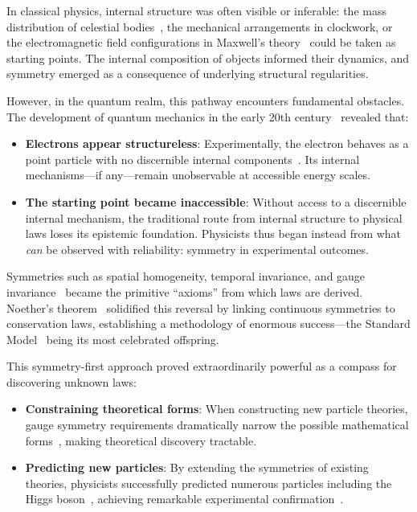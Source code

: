 \documentclass[%
 reprint,
 amsmath,amssymb,
 aps,
]{revtex4-1}
\numberwithin{equation}{section}%
\begin{document}
In classical physics, internal structure was often visible or inferable: the mass distribution of celestial bodies~\cite{newton1687}, the mechanical arrangements in clockwork, or the electromagnetic field configurations in Maxwell's theory~\cite{maxwell1873} could be taken as starting points. The internal composition of objects informed their dynamics, and symmetry emerged as a consequence of underlying structural regularities.

However, in the quantum realm, this pathway encounters fundamental obstacles. The development of quantum mechanics in the early 20th century~\cite{heisenberg1925,schrodinger1926} revealed that:

\begin{itemize}
  \item \textbf{Electrons appear structureless}: Experimentally, the electron behaves as a point particle with no discernible internal components~\cite{dehmelt1988}. Its internal mechanisms---if any---remain unobservable at accessible energy scales.
  \item \textbf{The starting point became inaccessible}: Without access to a discernible internal mechanism, the traditional route from internal structure to physical laws loses its epistemic foundation. Physicists thus began instead from what \emph{can} be observed with reliability: symmetry in experimental outcomes.
\end{itemize}

Symmetries such as spatial homogeneity, temporal invariance, and gauge invariance~\cite{yang1954} became the primitive ``axioms'' from which laws are derived. Noether's theorem~\cite{noether1918} solidified this reversal by linking continuous symmetries to conservation laws, establishing a methodology of enormous success---the Standard Model~\cite{glashow1961,weinberg1967,salam1968} being its most celebrated offspring.

This symmetry-first approach proved extraordinarily powerful as a compass for discovering unknown laws:

\begin{itemize}
\item \textbf{Constraining theoretical forms}: When constructing new particle theories, gauge symmetry requirements dramatically narrow the possible mathematical forms~\cite{thooft1971}, making theoretical discovery tractable.

\item \textbf{Predicting new particles}: By extending the symmetries of existing theories, physicists successfully predicted numerous particles including the Higgs boson~\cite{higgs1964,englert1964}, achieving remarkable experimental confirmation~\cite{aad2012,chatrchyan2012}.
\end{itemize}
\end{document}
